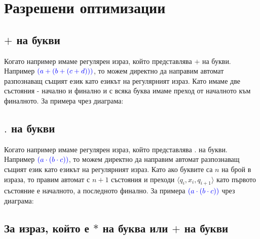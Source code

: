 \documentclass[12pt]{article}
\begin{document}
\section{Разрешени оптимизации}

\subsection{\(+\) на букви}
Когато например имаме регулярен израз, който представлява \(+\) на букви.
Например \(\textcolor{blue}{(a + (b + (c + d)))}\), то можем директно да направим автомат разпознаващ същият език като езикът на регулярният израз.
Като имаме две състояния - начално и финално и с всяка буква имаме преход от началното към финалното.
За примера чрез диаграма:

\begin{center}
\end{center}

\subsection{\(.\) на букви}
Когато например имаме регулярен израз, който представлява \(.\) на букви.
Например \(\textcolor{blue}{(a \cdot (b \cdot c))}\), то можем директно да направим автомат разпознаващ същият език като езикът на регулярният израз.
Като ако буквите са \(n\) на брой в израза, то правим автомат с \(n + 1\) състояния и преходи \(\langle q_i, x_i, q_{i + 1} \rangle\) като първото състояние е началното, а последното финално.
За примера \(\textcolor{blue}{(a \cdot (b \cdot c))}\) чрез диаграма:

\begin{center}
\end{center}

\subsection{За израз, който е \(*\) на буква или \(+\) на букви}
\end{document}
